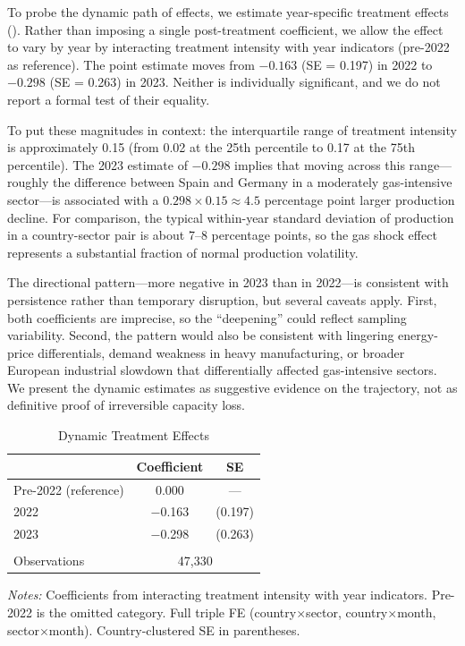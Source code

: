 \documentclass[12pt]{article}
\begin{document}
To probe the dynamic path of effects, we estimate year-specific treatment effects (). Rather than imposing a single post-treatment coefficient, we allow the effect to vary by year by interacting treatment intensity with year indicators (pre-2022 as reference). The point estimate moves from $-0.163$ (SE = 0.197) in 2022 to $-0.298$ (SE = 0.263) in 2023. Neither is individually significant, and we do not report a formal test of their equality.

To put these magnitudes in context: the interquartile range of treatment intensity is approximately 0.15 (from 0.02 at the 25th percentile to 0.17 at the 75th percentile). The 2023 estimate of $-0.298$ implies that moving across this range---roughly the difference between Spain and Germany in a moderately gas-intensive sector---is associated with a $0.298 \times 0.15 \approx 4.5$ percentage point larger production decline. For comparison, the typical within-year standard deviation of production in a country-sector pair is about 7--8 percentage points, so the gas shock effect represents a substantial fraction of normal production volatility.

The directional pattern---more negative in 2023 than in 2022---is consistent with persistence rather than temporary disruption, but several caveats apply. First, both coefficients are imprecise, so the ``deepening'' could reflect sampling variability. Second, the pattern would also be consistent with lingering energy-price differentials, demand weakness in heavy manufacturing, or broader European industrial slowdown that differentially affected gas-intensive sectors. We present the dynamic estimates as suggestive evidence on the trajectory, not as definitive proof of irreversible capacity loss.

\begin{table}[H]
\centering
\caption{Dynamic Treatment Effects}
\label{tab:dynamic}
\begin{threeparttable}
\begin{tabular}{lcc}
\toprule
& Coefficient & SE \\
\midrule
Pre-2022 (reference) & 0.000 & --- \\
2022 & $-$0.163 & (0.197) \\
2023 & $-$0.298 & (0.263) \\
\\
Observations & \multicolumn{2}{c}{47,330} \\
\bottomrule
\end{tabular}
\begin{tablenotes}[flushleft]
\small
\item \textit{Notes:} Coefficients from interacting treatment intensity with year indicators. Pre-2022 is the omitted category. Full triple FE (country$\times$sector, country$\times$month, sector$\times$month). Country-clustered SE in parentheses.
\end{tablenotes}
\end{threeparttable}
\end{table}
\end{document}
